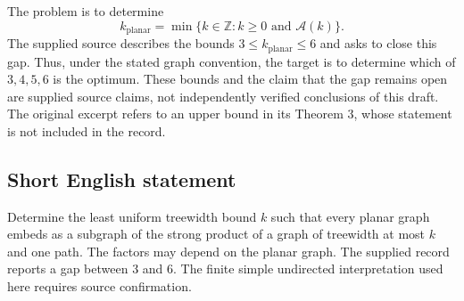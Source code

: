 \documentclass[11pt]{article}
\newcommand{\Z}{\mathbb{Z}}
\begin{document}
The problem is to determine
\[
k_{\mathrm{planar}}=\min\{k\in\Z:k\geq 0\text{ and }\mathcal A(k)\}.
\]
The supplied source describes the bounds \(3\leq k_{\mathrm{planar}}\leq 6\) and asks to close this gap. Thus, under the stated graph convention, the target is to determine which of \(3,4,5,6\) is the optimum. These bounds and the claim that the gap remains open are supplied source claims, not independently verified conclusions of this draft. The original excerpt refers to an upper bound in its Theorem 3, whose statement is not included in the record.
\subsection{Short English statement}
Determine the least uniform treewidth bound \(k\) such that every planar graph embeds as a subgraph of the strong product of a graph of treewidth at most \(k\) and one path. The factors may depend on the planar graph. The supplied record reports a gap between \(3\) and \(6\). The finite simple undirected interpretation used here requires source confirmation.
\end{document}

